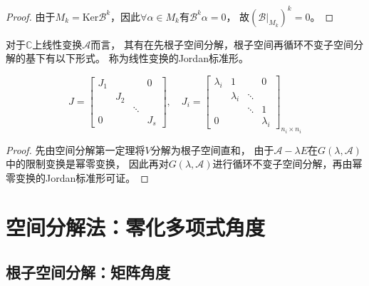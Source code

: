 \begin{proof}
  由于$M_k = \text{Ker} \mathcal{B}^k$，因此$\forall \alpha \in M_k$有$\mathcal{B}^k \alpha = 0$，
  故$( \mathcal{B} |_{M_k})^k = 0$。
\end{proof}

\begin{theorem}
  对于$\mathbb{C}$上线性变换$\mathcal{A}$而言，
  其有在先根子空间分解，根子空间再循环不变子空间分解的基下有以下形式。
  称为线性变换的Jordan标准形。
\end{theorem}


\begin{equation*}
  J=\left[\begin{array}{cccc}
            J_{1} & & & 0 \\
                  & J_{2} & & \\
                  & & \ddots & \\
            0 & & & J_{s}
          \end{array}\right], \quad J_{i}=\left[\begin{array}{cccc}
                                                  \lambda_{i} & 1 & & 0 \\
                                                              & \lambda_{i} & \ddots & \\
                                                              & & \ddots & 1 \\
                                                  0 & & & \lambda_{i}
                                                \end{array}\right]_{n_{i} \times n_{i}}
\end{equation*}

\begin{proof}
  先由空间分解第一定理将$V$分解为根子空间直和，
  由于$\mathcal{A} - \lambda E$在$G(\lambda, \mathcal{A})$中的限制变换是幂零变换，
  因此再对$G(\lambda, \mathcal{A})$进行循环不变子空间分解，再由幂零变换的Jordan标准形可证。
\end{proof}



\section{空间分解法：零化多项式角度}

\subsection{根子空间分解：矩阵角度}


